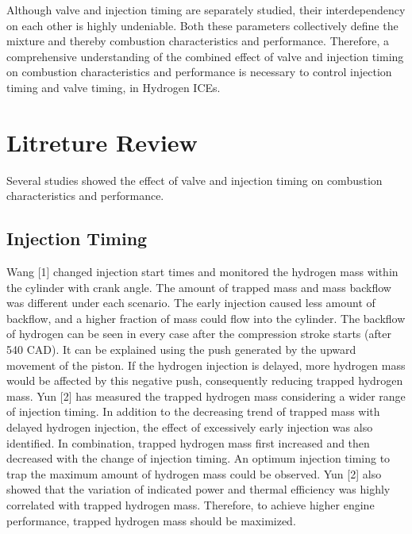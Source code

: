 \documentclass[conference]{IEEEtran}
\begin{document}
Although valve and injection timing are separately studied, their interdependency on each other is highly undeniable.
Both these parameters collectively define the mixture and thereby combustion characteristics and performance.
Therefore, a comprehensive understanding of the combined effect of valve and injection timing on combustion characteristics and performance is necessary to control injection timing and valve timing, in Hydrogen ICEs.\\

\section{Litreture Review}

Several studies showed the effect of valve and injection timing on combustion characteristics and performance.

\subsection{Injection Timing}

Wang [1] changed injection start times and monitored the hydrogen mass within the cylinder with crank angle.
The amount of trapped mass and mass backflow was different under each scenario.
The early injection caused less amount of backflow, and a higher fraction of mass could flow into the cylinder.
The backflow of hydrogen can be seen in every case after the compression stroke starts (after 540 CAD).
It can be explained using the push generated by the upward movement of the piston.
If the hydrogen injection is delayed, more hydrogen mass would be affected by this negative push, consequently reducing trapped hydrogen mass.
Yun [2] has measured the trapped hydrogen mass considering a wider range of injection timing.
In addition to the decreasing trend of trapped mass with delayed hydrogen injection, the effect of excessively early injection was also identified.
In combination, trapped hydrogen mass first increased and then decreased with the change of injection timing.
An optimum injection timing to trap the maximum amount of hydrogen mass could be observed.
Yun [2] also showed that the variation of indicated power and thermal efficiency was highly correlated with trapped hydrogen mass.
Therefore, to achieve higher engine performance, trapped hydrogen mass should be maximized.\\
\end{document}
